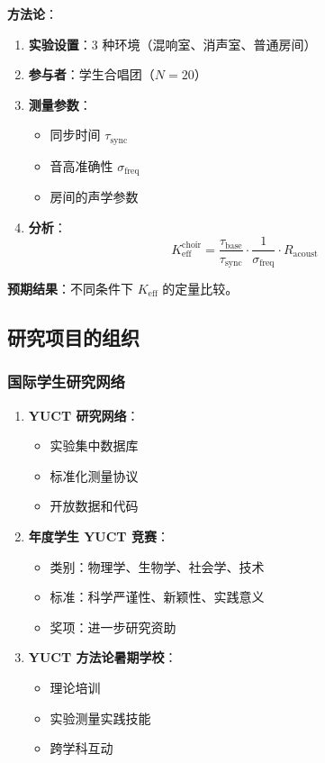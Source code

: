 \documentclass[12pt,a4paper]{article}
\begin{document}
	\textbf{方法论}：
	\begin{enumerate}
		\item \textbf{实验设置}：3 种环境（混响室、消声室、普通房间）
		\item \textbf{参与者}：学生合唱团（$N=20$）
		\item \textbf{测量参数}：
		\begin{itemize}
			\item 同步时间 $\tau_{\mathrm{sync}}$
			\item 音高准确性 $\sigma_{\mathrm{freq}}$
			\item 房间的声学参数
		\end{itemize}
		\item \textbf{分析}：
		\[
		K_{\mathrm{eff}}^{\mathrm{choir}} = \frac{\tau_{\mathrm{base}}}{\tau_{\mathrm{sync}}} \cdot \frac{1}{\sigma_{\mathrm{freq}}} \cdot R_{\mathrm{acoust}}
		\]
	\end{enumerate}
	
	\textbf{预期结果}：不同条件下 $K_{\mathrm{eff}}$ 的定量比较。
	
	\subsection{研究项目的组织}
	
	\subsubsection{国际学生研究网络}
	
	\begin{enumerate}
		\item \textbf{YUCT 研究网络}：
		\begin{itemize}
			\item 实验集中数据库
			\item 标准化测量协议
			\item 开放数据和代码
		\end{itemize}
		
		\item \textbf{年度学生 YUCT 竞赛}：
		\begin{itemize}
			\item 类别：物理学、生物学、社会学、技术
			\item 标准：科学严谨性、新颖性、实践意义
			\item 奖项：进一步研究资助
		\end{itemize}
		
		\item \textbf{YUCT 方法论暑期学校}：
		\begin{itemize}
			\item 理论培训
			\item 实验测量实践技能
			\item 跨学科互动
		\end{itemize}
	\end{enumerate}
	
\end{document}
